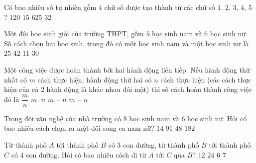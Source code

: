 

\begin{ex}%
	Có bao nhiêu số tự nhiên gồm $4$ chữ số được tạo  thành từ các chữ số $1$, $2$, $3$, $4$, $5$?
	\choice 
		 {$120$}
		{$15$} 
		{\True $625$} 
		 {$32$}
\end{ex}

\begin{ex}%
	Một đội học sinh giỏi của trường THPT, gồm $5$ học sinh nam và $6$ học sinh nữ. Số cách chọn hai học sinh,  trong đó có một học sinh nam và một học sinh nữ là
	\choice 
		 {$25$}
		{$42$} 
		 {$11$}
		{\True $30$} 
\end{ex}

\begin{ex}%
	Một công việc được hoàn thành bời hai hành động liên tiếp. Nếu hành động thứ nhất có $m$ cách thực hiện, hành động thứ hai có $n$ cách thực hiện (các cách thực hiện của cả $2$ hành động là khác nhau đôi một) thì số cách hoàn thành công việc  đó là
	\choice 
		{$\dfrac{m}{n}$} 
		{\True  $m\cdot n$}
		 {$m+n$}
		{$m-n$} 
\end{ex}

\begin{ex}%
	Trong đội văn nghệ của nhà trường có $8$ học sinh nam và $6$ học sinh nữ. Hỏi có bao nhiêu cách chọn  ra một đôi song ca nam nữ?
	\choice 
		 {$14$}
		 {$91$}
		{\True $48$} 
		 {$182$}
\end{ex}

\begin{ex}%
	Từ thành phố $A$ tới thành phố $B$ có $3$  con đường, từ thành phố $B$ tới thành phố $C$ có $4$ con đường. Hỏi có bao nhiêu cách đi từ $A$ tới $C$ qua $B$?
	\choice 
		 {\True $12$}
		{$24$} 
		 {$6$}
		{$7$} 
\end{ex}

